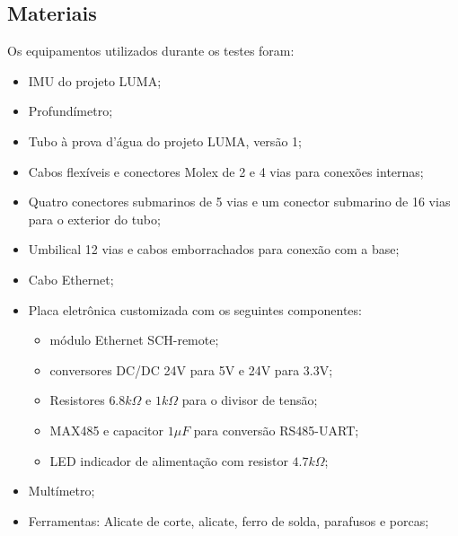 



\subsection{Materiais}
Os equipamentos utilizados durante os testes foram:
\begin{itemize}
  \item IMU do projeto LUMA;
  \item Profundímetro;
  \item Tubo à prova d'água do projeto LUMA, versão 1;
  \item Cabos flexíveis e conectores Molex de 2 e 4 vias para conexões internas;
  \item Quatro conectores submarinos de 5 vias e um conector submarino de 16
  vias para o exterior do tubo;
  \item Umbilical 12 vias e cabos emborrachados para conexão com a base;
  \item Cabo Ethernet;
  \item Placa eletrônica customizada com os seguintes componentes: 
  \begin{itemize}
    \item módulo Ethernet SCH-remote;
    \item conversores DC/DC 24V para 5V e 24V para 3.3V;
    \item Resistores $6.8k\Omega$ e $1k\Omega$ para o divisor de tensão;
    \item MAX485 e capacitor $1\mu F$ para conversão RS485-UART;
    \item LED indicador de alimentação com resistor $4.7k\Omega$;
  \end{itemize}
  \item Multímetro;
  \item Ferramentas: Alicate de corte, alicate, ferro de solda, parafusos e
  porcas;
\end{itemize}
\label{materials}




